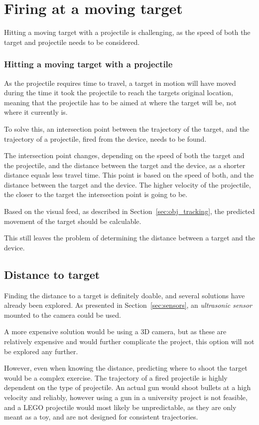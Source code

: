 \section{Firing at a moving target}
Hitting a moving target with a projectile is challenging, as the speed of both the target and projectile needs to be considered.

\subsubsection{Hitting a moving target with a projectile}
As the projectile requires time to travel, a target in motion will have moved during the time it took the projectile to reach the targets original location, meaning that the projectile has to be aimed at where the target will be, not where it currently is.


To solve this, an intersection point between the trajectory of the target, and the trajectory of a projectile, fired from the device, needs to be found.

The intersection point changes, depending on the speed of both the target and the projectile, and the distance between the target and the device, as a shorter distance equals less travel time.
This point is based on the speed of both, and the distance between the target and the device. 
The higher velocity of the projectile, the closer to the target the intersection point is going to be.

Based on the visual feed, as described in Section~\ref{sec:obj_tracking}, the predicted movement of the target should be calculable.


This still leaves the problem of determining the distance between a target and the device.
\subsection{Distance to target}
Finding the distance to a target is definitely doable, and several solutions have already been explored.
As presented in Section~\ref{sec:sensors}, an \textit{ultrasonic sensor} mounted to the camera could be used.

A more expensive solution would be using a 3D camera, but as these are relatively expensive and would further complicate the project, this option will not be explored any further.

However, even when knowing the distance, predicting where to shoot the target would be a complex exercise.
The trajectory of a fired projectile is highly dependent on the type of projectile.
An actual gun would shoot bullets at a high velocity and reliably, however using a gun in a university project is not feasible, and a LEGO projectile would most likely be unpredictable, as they are only meant as a toy, and are not designed for consistent trajectories.


